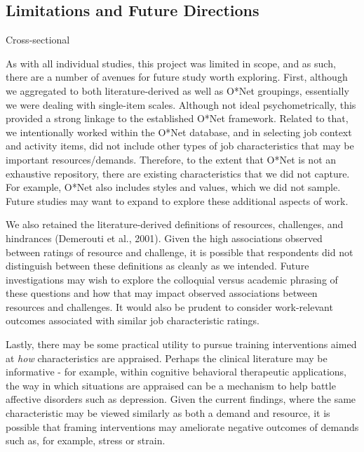 \documentclass[
  jou,mask]{apa6}
\begin{document}
\hypertarget{limitations-and-future-directions}{%
\subsection{Limitations and Future Directions}\label{limitations-and-future-directions}}

Cross-sectional

As with all individual studies, this project was limited in scope, and as such, there are a number of avenues for future study worth exploring. First, although we aggregated to both literature-derived as well as O*Net groupings, essentially we were dealing with single-item scales. Although not ideal psychometrically, this provided a strong linkage to the established O*Net framework. Related to that, we intentionally worked within the O*Net database, and in selecting job context and activity items, did not include other types of job characteristics that may be important resources/demands. Therefore, to the extent that O*Net is not an exhaustive repository, there are existing characteristics that we did not capture. For example, O*Net also includes styles and values, which we did not sample. Future studies may want to expand to explore these additional aspects of work.

We also retained the literature-derived definitions of resources, challenges, and hindrances (Demerouti et al., 2001). Given the high associations observed between ratings of resource and challenge, it is possible that respondents did not distinguish between these definitions as cleanly as we intended. Future investigations may wish to explore the colloquial versus academic phrasing of these questions and how that may impact observed associations between resources and challenges. It would also be prudent to consider work-relevant outcomes associated with similar job characteristic ratings.

Lastly, there may be some practical utility to pursue training interventions aimed at \emph{how} characteristics are appraised. Perhaps the clinical literature may be informative - for example, within cognitive behavioral therapeutic applications, the way in which situations are appraised can be a mechanism to help battle affective disorders such as depression. Given the current findings, where the same characteristic may be viewed similarly as both a demand and resource, it is possible that framing interventions may ameliorate negative outcomes of demands such as, for example, stress or strain.
\end{document}
